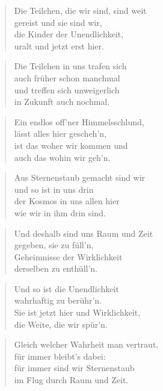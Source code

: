 \documentclass[10pt,a4paper]{article}
\begin{document}
\begin{paracol}{2}
\begin{verse}
Die Teilchen, die wir sind, sind weit \\
gereist und sie sind wir, \\
die Kinder der Unendlichkeit, \\
uralt und jetzt erst hier. \\
\end{verse}

\begin{verse}
Die Teilchen in uns trafen sich \\
auch früher schon manchmal \\
und treffen sich unweigerlich \\
in Zukunft auch nochmal. \\
\end{verse}

\begin{verse}
Ein endlos off’ner Himmelsschlund, \\
lässt alles hier gescheh’n, \\
ist das woher wir kommen und \\
auch das wohin wir geh’n. \\
\end{verse}

\begin{verse}
Aus Sternenstaub gemacht sind wir \\
und so ist in uns drin \\
der Kosmos in uns allen hier \\
wie wir in ihm drin sind. \\
\end{verse}

\begin{verse}
Und deshalb sind uns Raum und Zeit \\
gegeben, sie zu füll’n, \\
Geheimnisse der Wirklichkeit \\
derselben zu enthüll’n. \\
\end{verse}

\begin{verse}
Und so ist die Unendlichkeit \\
wahrhaftig zu berühr’n. \\
Sie ist jetzt hier und Wirklichkeit, \\
die Weite, die wir spür’n. \\
\end{verse}

\begin{verse}
Gleich welcher Wahrheit man vertraut, \\
für immer bleibt’s dabei: \\
für immer sind wir Sternenstaub \\
im Flug durch Raum und Zeit. \\
\end{verse}

\end{paracol}
\end{document}
